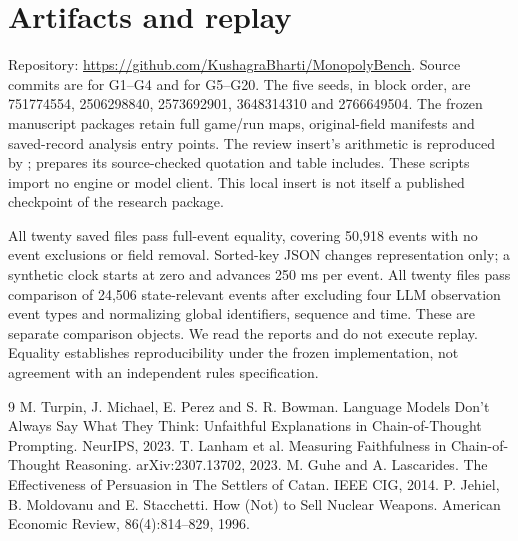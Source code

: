 \documentclass[11pt,letterpaper]{article}
\begin{document}
\section{Artifacts and replay}
Repository: \url{https://github.com/KushagraBharti/MonopolyBench}. Source commits are  for G1--G4 and  for G5--G20. The five seeds, in block order, are 751774554, 2506298840, 2573692901, 3648314310 and 2766649504. The frozen manuscript packages retain full game/run maps, original-field manifests and saved-record analysis entry points. The review insert's arithmetic is reproduced by ;  prepares its source-checked quotation and table includes. These scripts import no engine or model client. This local insert is not itself a published checkpoint of the research package.

All twenty saved  files pass full-event equality, covering 50,918 events with no event exclusions or field removal. Sorted-key JSON changes representation only; a synthetic clock starts at zero and advances 250 ms per event. All twenty  files pass comparison of 24,506 state-relevant events after excluding four LLM observation event types and normalizing global identifiers, sequence and time. These are separate comparison objects. We read the reports and do not execute replay. Equality establishes reproducibility under the frozen implementation, not agreement with an independent rules specification.

\begin{thebibliography}{9}
 M. Turpin, J. Michael, E. Perez and S. R. Bowman. Language Models Don't Always Say What They Think: Unfaithful Explanations in Chain-of-Thought Prompting. NeurIPS, 2023.
 T. Lanham et al. Measuring Faithfulness in Chain-of-Thought Reasoning. arXiv:2307.13702, 2023.
 M. Guhe and A. Lascarides. The Effectiveness of Persuasion in The Settlers of Catan. IEEE CIG, 2014.
 P. Jehiel, B. Moldovanu and E. Stacchetti. How (Not) to Sell Nuclear Weapons. American Economic Review, 86(4):814--829, 1996.
\end{thebibliography}
\end{document}
